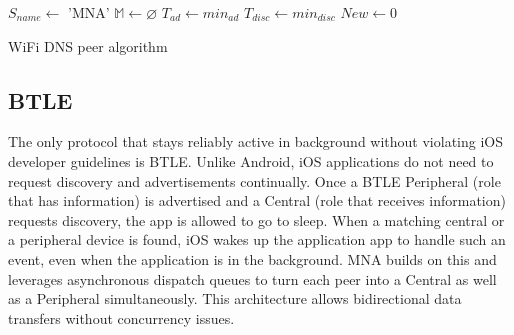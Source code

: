 \documentclass[conference]{IEEEtran}
\begin{document}
\begin{algorithm}[htb!]
\label{algo:dns}
\DontPrintSemicolon %
\SetAlgoLined
{}
 $S_{name} \gets$ \textsf{'MNA'}\;
 $\mathbb{M} \gets \varnothing$\;
 $T_{ad} \gets min_{ad}$\;
 $T_{disc} \gets min_{disc}$\;
 $New \gets 0$
 \caption{WiFi DNS peer algorithm}
\end{algorithm}
%
\subsection{BTLE}
\label{sec:btle}
%
The only protocol that stays reliably active in
background without violating iOS developer guidelines is BTLE. Unlike
Android, iOS applications do not need to request discovery and
advertisements continually. Once a BTLE Peripheral (role that has
information) is advertised and a Central (role that receives
information) requests discovery, the app is allowed to go to
sleep. When a matching central or a peripheral device is found, iOS
wakes up the application app to handle such an event, even when the
application is in the background. MNA builds on this and leverages
asynchronous dispatch queues to turn each peer into a Central as well
as a Peripheral simultaneously. This architecture allows bidirectional
data transfers without concurrency issues.
\end{document}
